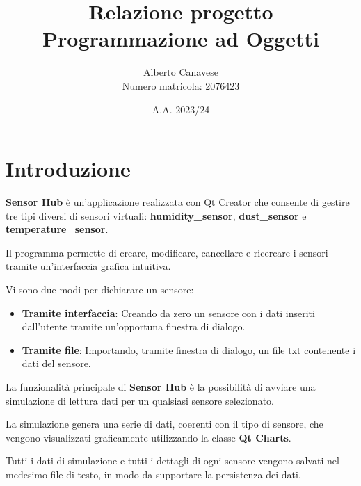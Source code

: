 \documentclass{article}
\title{Relazione progetto Programmazione ad Oggetti}
\author{Alberto Canavese\\Numero matricola: 2076423}
\date{A.A. 2023/24}
\begin{document}
    \pretitle{\begin{center}\LARGE}
    \posttitle{\end{center}}
    \preauthor{\begin{center}\large \lineskip 0.5em}
    \postauthor{\end{center}}
    \predate{\begin{center}\large}
    \postdate{\end{center}}
    \maketitle

    \renewcommand{\familydefault}{\sfdefault}

    \newpage
    \section{Introduzione}
    \textbf{Sensor Hub} è un'applicazione realizzata con Qt Creator che consente di gestire tre tipi
    diversi di sensori virtuali: \textbf{humidity\_sensor}, \textbf{dust\_sensor} e \textbf{temperature\_sensor}.
    
    Il programma permette di creare, modificare, cancellare e ricercare i sensori tramite un'interfaccia
    grafica intuitiva.
        
    Vi sono due modi per dichiarare un sensore:
    \begin{itemize}
        \item \textbf{Tramite interfaccia}: Creando da zero un sensore con i dati inseriti dall'utente tramite un'opportuna finestra di dialogo.
        \item \textbf{Tramite file}: Importando, tramite finestra di dialogo, un file txt contenente i dati del sensore.
    \end{itemize} 
    La funzionalità principale di \textbf{Sensor Hub} è la possibilità di avviare una simulazione di lettura dati per un qualsiasi sensore selezionato. 
    
    La simulazione genera una serie di dati, coerenti con il tipo di sensore, che vengono visualizzati graficamente utilizzando la classe \textbf{Qt Charts}.

    Tutti i dati di simulazione e tutti i dettagli di ogni sensore vengono salvati nel medesimo file di testo, in modo da supportare la persistenza dei dati. 
\end{document}

